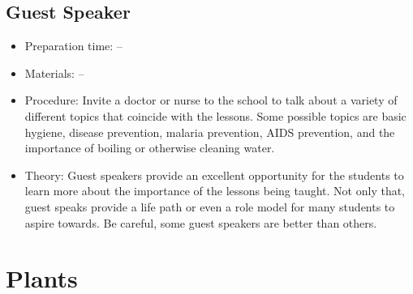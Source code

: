 \subsection{Guest Speaker}
\begin{itemize}
\item{Preparation time: --}
\item{Materials: --}
\item{Procedure: Invite a doctor or nurse to the school to talk about a variety of different topics that coincide with the lessons. Some possible topics are basic hygiene, disease prevention, malaria prevention, AIDS prevention, and the importance of boiling or otherwise cleaning water.}
\item{Theory: Guest speakers provide an excellent opportunity for the students to learn more about the importance of the lessons being taught. Not only that, guest speaks provide a life path or even a role model for many students to aspire towards. Be careful, some guest speakers are better than others.}
\end{itemize}

\section{Plants}

